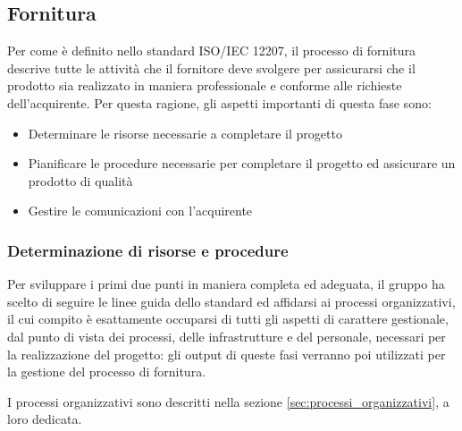 \subsection{Fornitura}\label{sec:processi_primari:fornitura}
Per come è definito nello standard ISO/IEC 12207, il processo di fornitura descrive tutte le attività che il fornitore deve svolgere per assicurarsi che il prodotto sia realizzato in maniera professionale e conforme alle richieste dell'acquirente. Per questa ragione, gli aspetti importanti di questa fase sono:
\begin{itemize}
    \item Determinare le risorse necessarie a completare il progetto
    \item Pianificare le procedure necessarie per completare il progetto ed assicurare un prodotto di qualità
    \item Gestire le comunicazioni con l'acquirente
\end{itemize}
\subsubsection{Determinazione di risorse e procedure}
Per sviluppare i primi due punti in maniera completa ed adeguata, il gruppo ha scelto di seguire le linee guida dello standard ed affidarsi ai processi organizzativi, il cui compito è esattamente occuparsi di tutti gli aspetti di carattere gestionale, dal punto di vista dei processi, delle infrastrutture e del personale, necessari per la realizzazione del progetto: gli output di queste fasi verranno poi utilizzati per la gestione del processo di fornitura.
\par I processi organizzativi sono descritti nella sezione \ref{sec:processi_organizzativi}, a loro dedicata.
